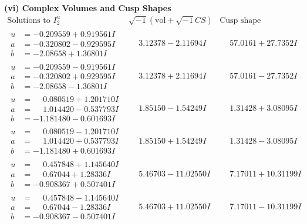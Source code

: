 \documentclass[1p]{elsarticle_modified}
\theoremstyle{definition}
\newcommand{\I}{\sqrt{-1}}
\begin{document}
\newpage\flushleft \textbf{(vi) Complex Volumes and Cusp Shapes}
$$\begin{array}{c|c|c}  
\text{Solutions to }I^u_{2}& \I (\text{vol} + \sqrt{-1}CS) & \text{Cusp shape}\\
 \hline 
\begin{aligned}
u &= -0.209559 + 0.919561 I \\
a &= -0.320802 - 0.929595 I \\
b &= -2.08658 + 1.36801 I\end{aligned}
 & \phantom{-}3.12378 - 2.11694 I & \phantom{-}57.0161 + 27.7352 I \\ \hline\begin{aligned}
u &= -0.209559 - 0.919561 I \\
a &= -0.320802 + 0.929595 I \\
b &= -2.08658 - 1.36801 I\end{aligned}
 & \phantom{-}3.12378 + 2.11694 I & \phantom{-}57.0161 - 27.7352 I \\ \hline\begin{aligned}
u &= \phantom{-}0.080519 + 1.201710 I \\
a &= \phantom{-}1.014420 - 0.537793 I \\
b &= -1.181480 - 0.601693 I\end{aligned}
 & \phantom{-}1.85150 - 1.54249 I & \phantom{-}1.31428 + 3.08095 I \\ \hline\begin{aligned}
u &= \phantom{-}0.080519 - 1.201710 I \\
a &= \phantom{-}1.014420 + 0.537793 I \\
b &= -1.181480 + 0.601693 I\end{aligned}
 & \phantom{-}1.85150 + 1.54249 I & \phantom{-}1.31428 - 3.08095 I \\ \hline\begin{aligned}
u &= \phantom{-}0.457848 + 1.145640 I \\
a &= \phantom{-}0.67044 + 1.28336 I \\
b &= -0.908367 + 0.507401 I\end{aligned}
 & \phantom{-}5.46703 - 11.02550 I & \phantom{-}7.17011 + 10.31199 I \\ \hline\begin{aligned}
u &= \phantom{-}0.457848 - 1.145640 I \\
a &= \phantom{-}0.67044 - 1.28336 I \\
b &= -0.908367 - 0.507401 I\end{aligned}
 & \phantom{-}5.46703 + 11.02550 I & \phantom{-}7.17011 - 10.31199 I \\ \hline\begin{aligned}

\end{aligned}
\end{array}$$
\end{document}
